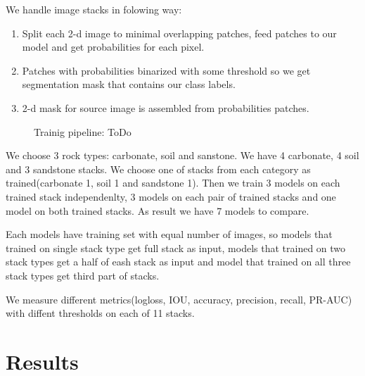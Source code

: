 \documentclass[review]{elsarticle}
\begin{document}
We handle image stacks in folowing way:
\begin{enumerate}
 	\item Split each 2-d image to minimal overlapping patches,
 	feed patches to our model and get probabilities for each pixel.
 	\item Patches with probabilities binarized with some threshold 			so we get 
 	segmentation mask that contains our class labels.
 	\item 2-d mask for source image is assembled from probabilities 		patches. 
\end{enumerate}
\begin{figure}[h]
	\caption{Trainig pipeline: ToDo}
	\label{Unet:training}
\end{figure}


We choose 3 rock types: carbonate, soil and sanstone. We have 
4 carbonate, 4 soil and 3 sandstone stacks. We choose one of stacks from each category as trained(carbonate 1, soil 1 and sandstone 1).
Then we train 3 models on each trained stack independenlty, 3 models on each pair of trained stacks and one model on both trained stacks.
As result we have 7 models to compare.

Each models have training set  with equal number of images, so 
models that trained on single stack type get full stack as input,
models that trained on two stack types get a half of eash stack as input and model that trained on all three stack types get third part
of stacks.    

We measure different metrics(logloss, IOU, accuracy, precision, recall, PR-AUC) with diffent thresholds on each of 11 stacks.


\section{Results}
\end{document}
